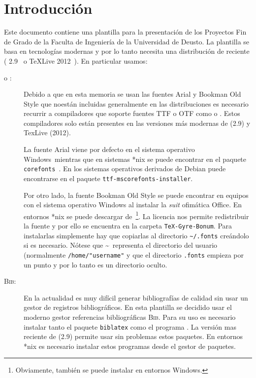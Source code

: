 \documentclass{DeustoFDP}
\begin{document}
\chapter{Introducci\'on}\label{cha:introduccion}

Este documento contiene una plantilla para la presentaci\'on de los Proyectos
Fin de Grado de la Faculta de Ingenier\'ia de la Universidad de Deusto. La
plantilla se basa en tecnolog\'ias modernas y por lo tanto necesita una
distribuci\'on de  reciente ( 2.9~\cite{miktex} o
TeXLive 2012~\cite{texlive}). En particular usamos:
\begin{description}
  \item[ o :] Debido a que en esta memoria se
    usan las fuentes Arial y Bookman Old Style que noest\'an incluidas generalmente en
    las distribuciones  es necesario recurrir a compiladores que
    soporte fuentes TTF o OTF como  o .
    Estos compiladores solo est\'an presentes en las versiones m\'as modernas de
     (2.9) y TexLive (2012).

    La fuente Arial viene por defecto en el sistema operativo Windows\textregistered\
    mientras que en sistemas *nix se puede encontrar en el paquete
    \texttt{corefonts}~\cite{corefonts}. En los sistemas operativos derivados
    de Debian puede encontrarse en el paquete \texttt{ttf-mscorefonts-installer}.

    Por otro lado, la fuente Bookman Old Style se puede encontrar en equipos con
    el sistema operativo Windows al instalar la \emph{suit} ofim\'atica
    Office\textregistered. En entornos *nix se puede descargar
    de~\cite{fuente}\footnote{Obviamente, tambi\'en se puede instalar
    en entornos Windows\textregistered.}. La licencia nos permite redistribuir
    la fuente y por ello se encuentra en la carpeta \texttt{TeX-Gyre-Bonum}.
    Para instalarlas simplemente hay que copiarlas al directorio
    \verb+~/.fonts+ cre\'andolo si es necesario. N\'otese que \textasciitilde\ representa el
    directorio del usuario (normalmente \verb+/home/"username"+ y que el directorio
    \verb+.fonts+ empieza por un punto y por lo tanto es un directorio oculto.

  \item[\textsc{Bib}:] En la actualidad es muy dif\'icil generar
    bibliograf\'ias de calidad sin usar un gestor de registros bibliogr\'aficos.
    En esta plantilla se decidido usar el moderno gestor referencias
    bibliogr\'aficas \textsc{Bib}\hologo{LaTeX}. Para su uso es necesario instalar
    tanto el paquete \texttt{biblatex} como el programa \hologo{biber}.
    La versi\'on mas reciente de \hologo{MiKTeX} (2.9) permite usar sin problemas
    estos paquetes. En entornos *nix es necesario instalar estos programas desde
    el gestor de paquetes.


\end{description}
\end{document}
